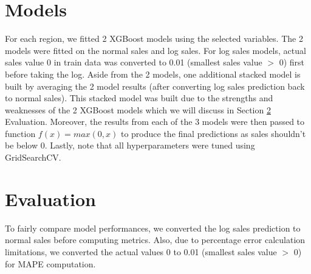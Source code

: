 \documentclass[12pt]{article}
\begin{document}

\section{Models}

For each region, we fitted 2 XGBoost models using the selected variables. The 2 models were fitted on the normal sales and log sales. For log sales models, actual sales value 0 in train data was converted to 0.01 (smallest sales value $>$ 0) first before taking the log. Aside from the 2 models, one additional stacked model is built by averaging the 2 model results (after converting log sales prediction back to normal sales). This stacked model was built due to the strengths and weaknesses of the 2 XGBoost models which we will discuss in Section \ref{eval} Evaluation. Moreover, the results from each of the 3 models were then passed to function $f(x) = max(0, x)$ to produce the final predictions as sales shouldn't be below 0. Lastly, note that all hyperparameters were tuned using GridSearchCV.

\section{Evaluation}\label{eval}
To fairly compare model performances, we converted the log sales prediction to normal sales before computing metrics. Also, due to percentage error calculation limitations, we converted the actual values 0 to 0.01 (smallest sales value $>$ 0) for MAPE computation.
\end{document}
